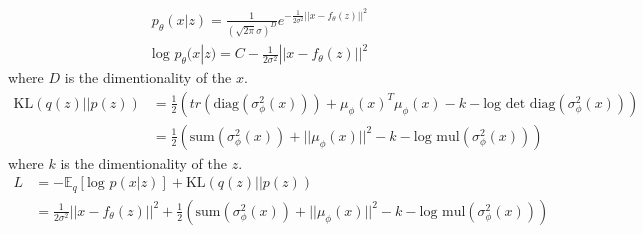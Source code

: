 \documentclass{article}
\newcommand*{\ex}[1]{
    \mathbb{E}_{#1}
}
\begin{document}
\subsection{}
\begin{align*}
    p_{\theta}(x|z) = \frac{1}{(\sqrt{2\pi} \sigma)^D} e ^ {-\frac{1}{2\sigma^2}||x - f_{\theta}(z)||^2} \\
    \text{log } p_{\theta}(x|z) = C - \frac{1}{2\sigma^2}||x - f_{\theta}(z)||^2
\end{align*}
where $D$ is the dimentionality of the $x$.
\begin{align*}
    \text{KL}(q(z)||p(z)) 
    &= \frac{1}{2}(tr(\text{diag}(\sigma_{\phi}^2(x))) + \mu_{\phi}(x)^T\mu_{\phi}(x) - k - \text{log } \text{det } \text{diag}(\sigma_{\phi}^2(x))) \\
    &= \frac{1}{2}\left(\text{sum}(\sigma_{\phi}^2(x)) + ||\mu_{\phi}(x)||^2 - k - \text{log mul}(\sigma_{\phi}^2(x))\right)
\end{align*}
where $k$ is the dimentionality of the $z$.
\begin{align*}
    L 
    &= -\ex{q}[\text{log } p(x|z)] + \text{KL} (q(z)||p(z)) \\
    &= \frac{1}{2\sigma^2}||x - f_{\theta}(z)||^2 + \frac{1}{2}\left(\text{sum}(\sigma_{\phi}^2(x)) + ||\mu_{\phi}(x)||^2 - k - \text{log mul}(\sigma_{\phi}^2(x))\right)
\end{align*}
\end{document}
